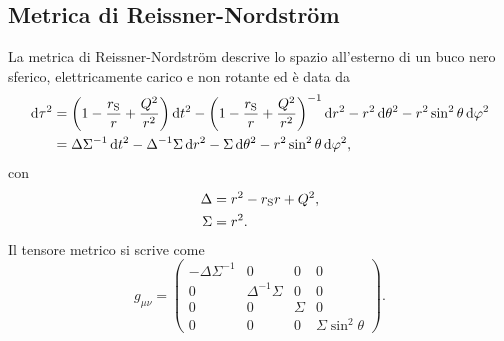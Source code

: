 \subsection{Metrica di Reissner-Nordström}
\label{sec:metrica-reissner}

La metrica di Reissner-Nordström descrive lo spazio all'esterno di un buco nero
sferico, elettricamente carico e non rotante ed è data da
\begin{equation}
  \label{eq:metrica-reissner}
  \begin{split}
    \dd\tau^{2} &= \biggl(1 - \frac{r_{\textup{S}}}{r} +
    \frac{Q^{2}}{r^{2}}\biggr)\dd t^{2} - \biggl(1 - \frac{r_{\textup{S}}}{r} +
    \frac{Q^{2}}{r^{2}}\biggr)^{-1}\dd r^{2} - r^{2}\dd\theta^{2} -
    r^{2}\sin^{2}\theta\dd\phi^{2} \\
    &= \Delta\Sigma^{-1}\dd t^{2} - \Delta^{-1}\Sigma\dd r^{2} -
    \Sigma\dd\theta^{2} - r^{2}\sin^{2}\theta\dd\phi^{2},
  \end{split}
\end{equation}
con
\begin{subequations}
  \begin{align}
    \Delta &= r^{2} - r_{\textup{S}}r + Q^{2}, \\
    \Sigma &= r^{2}.
  \end{align}
\end{subequations}
Il tensore metrico si scrive come
\begin{equation}
  g_{\mu\nu} =
  \begin{pmatrix}
    -\Delta\Sigma^{-1} & 0                 & 0      & 0 \\
    0                  & \Delta^{-1}\Sigma & 0      & 0 \\
    0                  & 0                 & \Sigma & 0 \\
    0                  & 0                 & 0      & \Sigma\sin^{2}\theta
  \end{pmatrix}.
\end{equation}

